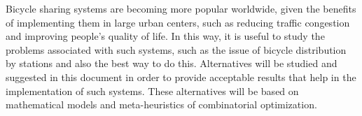 Bicycle sharing systems are becoming more popular worldwide, given the benefits of implementing them in large urban centers, such as reducing traffic congestion and improving people's quality of life. In this way, it is useful to study the problems associated with such systems, such as the issue of bicycle distribution by stations and also the best way to do this. Alternatives will be studied and suggested in this document in order to provide acceptable results that help in the implementation of such systems. These alternatives will be based on mathematical models and meta-heuristics of combinatorial optimization.